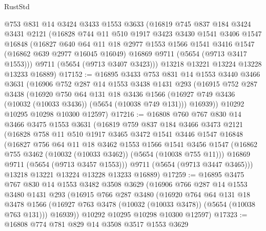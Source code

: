 \begin{lexlean}{RustStd}
\begin{coremodule}
    @753
    @831
    @14
    @3424
    @3433
    @1553
    @3633
    (@16819
      @745
      @837
      @184
      @3424
      @3431
      @2121
      (@16828
        @744
        @11
        @510
        @1917
        @3423
        @3430
        @1541
        @3406
        @1547
        @16848
        (@16827
          @640
          @64
          @11
          @18
          @2977
          @1553
          @1566
          @1541
          @3416
          @1547
          (@16862 @639 @2977 @16045 @16049)
          @16869
          @9711
          (@5654 (@9713 @3417 @1553)))
        @9711
        (@5654 (@9713 @3407 @3423)))
      @13218
      @13221
      @13224
      @13228
      @13233
      @16889)
@17152 := @16895
    @3433
    @753
    @831
    @14
    @1553
    @3440
    @3466
    @3631
    (@16906
      @752
      @287
      @14
      @1553
      @3438
      @1431
      @293
      (@16915
        @752
        @287
        @3438
        (@16920
          @750
          @64
          @131
          @18
          @3436
          @1566
          (@16927 @749 @3436 (@10032 (@10033 @3436)) (@5654 (@10038 @749 @131)))
          @16939))
      @10292
      @10295
      @10298
      @10300
      @12597)
@17216 := @16808
    @760
    @767
    @830
    @14
    @3466
    @3475
    @1553
    @3631
    (@16819
      @759
      @837
      @184
      @3466
      @3473
      @2121
      (@16828
        @758
        @11
        @510
        @1917
        @3465
        @3472
        @1541
        @3446
        @1547
        @16848
        (@16827
          @756
          @64
          @11
          @18
          @3462
          @1553
          @1566
          @1541
          @3456
          @1547
          (@16862 @755 @3462 (@10032 (@10033 @3462)) (@5654 (@10038 @755 @11)))
          @16869
          @9711
          (@5654 (@9713 @3457 @1553)))
        @9711
        (@5654 (@9713 @3447 @3465)))
      @13218
      @13221
      @13224
      @13228
      @13233
      @16889)
@17259 := @16895
    @3475
    @767
    @830
    @14
    @1553
    @3482
    @3508
    @3629
    (@16906
      @766
      @287
      @14
      @1553
      @3480
      @1431
      @293
      (@16915
        @766
        @287
        @3480
        (@16920
          @764
          @64
          @131
          @18
          @3478
          @1566
          (@16927 @763 @3478 (@10032 (@10033 @3478)) (@5654 (@10038 @763 @131)))
          @16939))
      @10292
      @10295
      @10298
      @10300
      @12597)
@17323 := @16808
    @774
    @781
    @829
    @14
    @3508
    @3517
    @1553
    @3629

\end{coremodule}
\end{lexlean}
